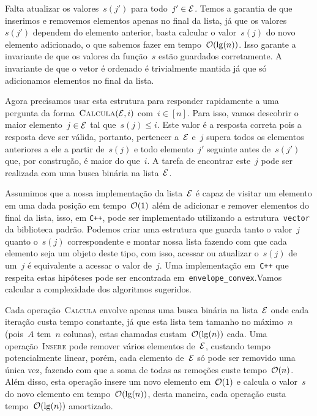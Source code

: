 Falta atualizar os valores~$s(j')$ para todo~$j' \in \mathcal{E}$. Temos a garantia de que inserimos e removemos elementos apenas no final da lista, já que os valores~$s(j')$ dependem do elemento anterior, basta calcular o valor~$s(j)$ do novo elemento adicionado, o que sabemos fazer em tempo~$\mathcal{O}(\lg(n))$. Isso garante a invariante de que os valores da função~$s$ estão guardados corretamente. A invariante de que o vetor é ordenado é trivialmente mantida já que só adicionamos elementos no final da lista.

Agora precisamos usar esta estrutura para responder rapidamente a uma pergunta da forma~${ \textsc{Calcula}(\mathcal{E},i) }$ com~$i \in [n]$. Para isso, vamos descobrir o maior elemento~$j \in \mathcal{E}$ tal que~$s(j) \leq i$. Este valor é a resposta correta pois a resposta deve ser válida, portanto, pertencer a~$\mathcal{E}$ e~$j$ supera todos os elementos anteriores a ele a partir de~$s(j)$ e todo elemento~$j'$ seguinte antes de~$s(j')$ que, por construção, é maior do que~$i$. A tarefa de encontrar este~$j$ pode ser realizada com uma busca binária na lista~$\mathcal{E}$.

Assumimos que a nossa implementação da lista~$\mathcal{E}$ é capaz de visitar um elemento em uma dada posição em tempo~$\mathcal{O}(1)$ além de adicionar e remover elementos do final da lista, isso, em \texttt{C++}, pode ser implementado utilizando a estrutura~\texttt{vector} da biblioteca padrão. Podemos criar uma estrutura que guarda tanto o valor~$j$ quanto o~$s(j)$ correspondente e montar nossa lista fazendo com que cada elemento seja um objeto deste tipo, com isso, acessar ou atualizar o~$s(j)$ de um~$j$ é equivalente a acessar o valor de~$j$. Uma implementação em~\texttt{C++} que respeita estas hipóteses pode ser encontrada em~\texttt{envelope\_convex}.Vamos calcular a complexidade dos algoritmos sugeridos.

Cada operação~\textsc{Calcula} envolve apenas uma busca binária na lista~$\mathcal{E}$ onde cada iteração custa tempo constante, já que esta lista tem tamanho no máximo~$n$ (pois~$A$ tem~$n$ colunas), estas chamadas custam~$\mathcal{O}(\lg(n))$ cada. Uma operação~\textsc{Insere} pode remover vários elementos de~$\mathcal{E}$, custando tempo potencialmente linear, porém, cada elemento de~$\mathcal{E}$ só pode ser removido uma única vez, fazendo com que a soma de todas as remoções custe tempo~$\mathcal{O}(n)$. Além disso, esta operação insere um novo elemento em~$\mathcal{O}(1)$ e calcula o valor~$s$ do novo elemento em tempo~$\mathcal{O}(\lg(n))$, desta maneira, cada operação custa tempo~$\mathcal{O}(\lg(n))$ amortizado.


